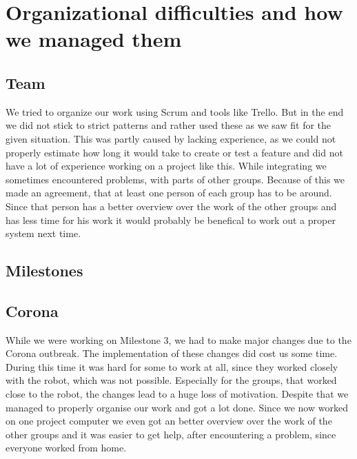 \documentclass[main.tex]{subfiles}
\begin{document}
	\begingroup

	\renewcommand{\cleardoublepage}{}

	\renewcommand{\clearpage}{}

	\chapter{Organizational difficulties and how we managed them}

		
		\section{Team}
		We tried to organize our work using Scrum and tools like Trello. But in the end we did not stick to strict patterns and rather used these as we saw fit for the given situation. This was partly caused by lacking experience, as we could not properly estimate how long it would take to create or test a feature and did not have a lot of experience working on a project like this.
		While integrating we sometimes encountered problems, with parts of other groups. Because of this we made an agreement, that at least one person of each group has to be around. Since that person has a better overview over the work of the other groups and has less time for his work it would probably be benefical to work out a proper system next time.
		
		
		\section{Milestones}
		
		\section{Corona}
	  	While we were working on Milestone 3, we had to make major changes due to the Corona outbreak. The implementation of these changes did cost us some time. During this time it was hard for some to work at all, since they worked closely with the robot, which was not possible.
	  	Especially for the groups, that worked close to the robot, the changes lead to a huge loss of motivation.
	  	Despite that we managed to properly organise our work and got a lot done.
	  	Since we now worked on one project computer we even got an better overview over the work of the other groups and it was easier to get help, after encountering a problem, since everyone worked from home.

	\endgroup
\end{document}
